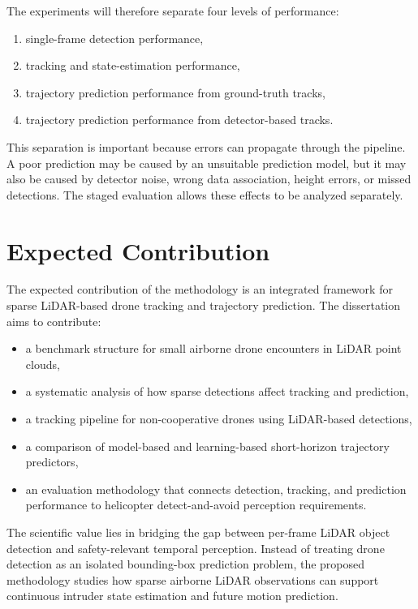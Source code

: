 The experiments will therefore separate four levels of performance:

\begin{enumerate}
\item single-frame detection performance,
\item tracking and state-estimation performance,
\item trajectory prediction performance from ground-truth tracks,
\item trajectory prediction performance from detector-based tracks.
\end{enumerate}

This separation is important because errors can propagate through the pipeline. A poor prediction may be caused by an unsuitable prediction model, but it may also be caused by detector noise, wrong data association, height errors, or missed detections. The staged evaluation allows these effects to be analyzed separately.

\section{Expected Contribution}

The expected contribution of the methodology is an integrated framework for sparse LiDAR-based drone tracking and trajectory prediction. The dissertation aims to contribute:

\begin{itemize}
\item a benchmark structure for small airborne drone encounters in LiDAR point clouds,
\item a systematic analysis of how sparse detections affect tracking and prediction,
\item a tracking pipeline for non-cooperative drones using LiDAR-based detections,
\item a comparison of model-based and learning-based short-horizon trajectory predictors,
\item an evaluation methodology that connects detection, tracking, and prediction performance to helicopter detect-and-avoid perception requirements.
\end{itemize}

The scientific value lies in bridging the gap between per-frame LiDAR object detection and safety-relevant temporal perception. Instead of treating drone detection as an isolated bounding-box prediction problem, the proposed methodology studies how sparse airborne LiDAR observations can support continuous intruder state estimation and future motion prediction.